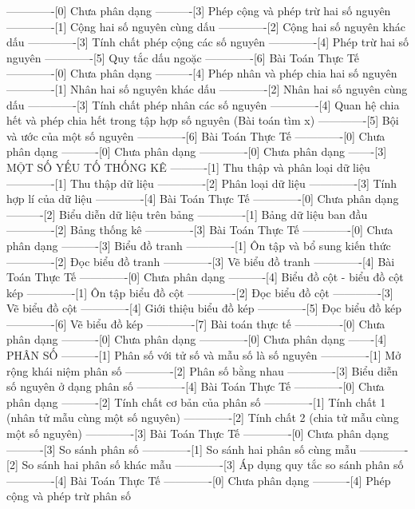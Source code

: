 -------------[0] Chưa phân dạng
----------[3] Phép cộng và phép trừ hai số nguyên
-------------[1] Cộng hai số nguyên cùng dấu
-------------[2] Cộng hai số nguyên khác dấu
-------------[3] Tính chất phép cộng các số nguyên
-------------[4] Phép trừ hai số nguyên
-------------[5] Quy tắc dấu ngoặc
-------------[6] Bài Toán Thực Tế
-------------[0] Chưa phân dạng
----------[4] Phép nhân và phép chia hai số nguyên
-------------[1] Nhân hai số nguyên khác dấu
-------------[2] Nhân hai số nguyên cùng dấu
-------------[3] Tính chất phép nhân các số nguyên
-------------[4] Quan hệ chia hết và phép chia hết trong tập hợp số nguyên (Bài toán tìm x)
-------------[5] Bội và ước của một số nguyên
-------------[6] Bài Toán Thực Tế
-------------[0] Chưa phân dạng
----------[0] Chưa phân dạng
-------------[0] Chưa phân dạng
-------[3] MỘT SỐ YẾU TỐ THỐNG KÊ
----------[1] Thu thập và phân loại dữ liệu
-------------[1] Thu thập dữ liệu
-------------[2] Phân loại dữ liệu
-------------[3] Tính hợp lí của dữ liệu
-------------[4] Bài Toán Thực Tế
-------------[0] Chưa phân dạng
----------[2] Biểu diễn dữ liệu trên bảng
-------------[1] Bảng dữ liệu ban đầu
-------------[2] Bảng thống kê
-------------[3] Bài Toán Thực Tế
-------------[0] Chưa phân dạng
----------[3] Biểu đồ tranh
-------------[1] Ôn tập và bổ sung kiến thức
-------------[2] Đọc biểu đồ tranh
-------------[3] Vẽ biểu đồ tranh
-------------[4] Bài Toán Thực Tế
-------------[0] Chưa phân dạng
----------[4] Biểu đồ cột - biểu đồ cột kép
-------------[1] Ôn tập biểu đồ cột
-------------[2] Đọc biểu đồ cột
-------------[3] Vẽ biểu đồ cột
-------------[4] Giới thiệu biểu đồ kép
-------------[5] Đọc biểu đồ kép
-------------[6] Vẽ biểu đồ kép
-------------[7] Bài toán thực tế
-------------[0] Chưa phân dạng
----------[0] Chưa phân dạng
-------------[0] Chưa phân dạng
-------[4] PHÂN SỐ
----------[1] Phân số với tử số và mẫu số là số nguyên
-------------[1] Mở rộng khái niệm phân số
-------------[2] Phân số bằng nhau
-------------[3] Biểu diễn số nguyên ở dạng phân số
-------------[4] Bài Toán Thực Tế
-------------[0] Chưa phân dạng
----------[2] Tính chất cơ bản của phân số
-------------[1] Tính chất 1 (nhân tử mẫu cùng một số nguyên)
-------------[2] Tính chất 2 (chia tử mẫu cùng một số nguyên)
-------------[3] Bài Toán Thực Tế
-------------[0] Chưa phân dạng
----------[3] So sánh phân số
-------------[1] So sánh hai phân số cùng mẫu
-------------[2] So sánh hai phân số khác mẫu
-------------[3] Áp dụng quy tắc so sánh phân số
-------------[4] Bài Toán Thực Tế
-------------[0] Chưa phân dạng
----------[4] Phép cộng và phép trừ phân số
